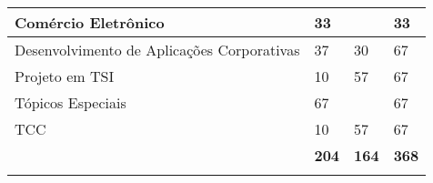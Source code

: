 \begin{table}[h]
\begin{tabular}{llll}
\multicolumn{1}{|l|}{Comércio Eletrônico}         & \multicolumn{1}{l|}{33}                                       & \multicolumn{1}{l|}{}                                       & \multicolumn{1}{l|}{33}                                     \\ \hline
\multicolumn{1}{|l|}{Desenvolvimento de Aplicações Corporativas}               & \multicolumn{1}{l|}{37}                                      & \multicolumn{1}{l|}{30}                                         & \multicolumn{1}{l|}{67}                                    \\ \hline
\multicolumn{1}{|l|}{Projeto em TSI}                    & \multicolumn{1}{l|}{10}                                       & \multicolumn{1}{l|}{57}                                         & \multicolumn{1}{l|}{67}                                    \\ \hline
\multicolumn{1}{|l|}{Tópicos Especiais}                       & \multicolumn{1}{l|}{67}                                       & \multicolumn{1}{l|}{}                                        & \multicolumn{1}{l|}{67}                                     \\ \hline
\multicolumn{1}{|l|}{TCC}                       & \multicolumn{1}{l|}{10}                                       & \multicolumn{1}{l|}{57}                                       & \multicolumn{1}{l|}{67}                                     \\ \hline
\rowcolor[HTML]{34CDF9} 
\multicolumn{1}{|r|}{\cellcolor[HTML]{34CDF9}\textbf{Subtotal}}    & \multicolumn{1}{l|}{\cellcolor[HTML]{34CDF9}\textbf{204}}     & \multicolumn{1}{l|}{\cellcolor[HTML]
{34CDF9}\textbf{164}}     & \multicolumn{1}{l|}{\cellcolor[HTML]{34CDF9}\textbf{368}}   \\ \hline
\multicolumn{4}{l}{}                                                                                                                                                                                                                                            
\end{tabular}
\end{table}

\newpage


